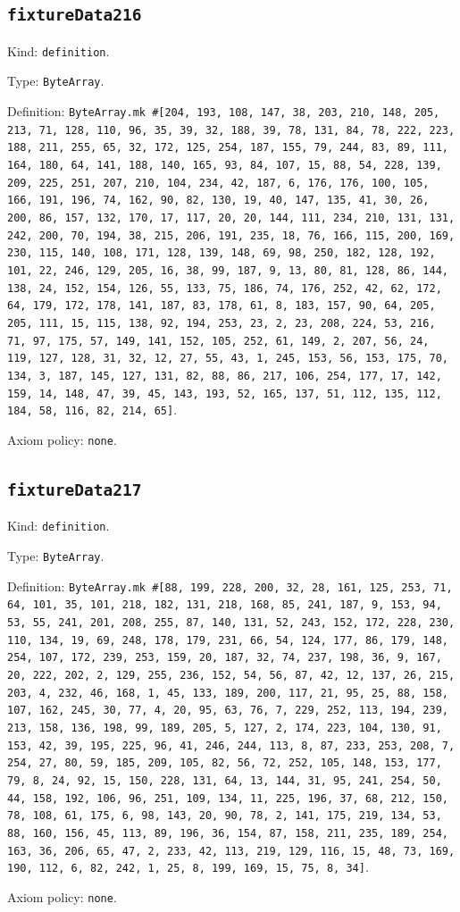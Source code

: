 \documentclass[11pt]{article}
\begin{document}
\subsection*{\texttt{fixtureData216}}
\noindent Kind: \texttt{definition}.\par
\noindent Type: \texttt{ByteArray}.\par
\noindent Definition: \texttt{ByteArray.mk \#[204, 193, 108, 147, 38, 203, 210, 148, 205, 213, 71, 128, 110, 96, 35, 39, 32, 188, 39, 78, 131, 84, 78, 222, 223, 188, 211, 255, 65, 32, 172, 125, 254, 187, 155, 79, 244, 83, 89, 111, 164, 180, 64, 141, 188, 140, 165, 93, 84, 107, 15, 88, 54, 228, 139, 209, 225, 251, 207, 210, 104, 234, 42, 187, 6, 176, 176, 100, 105, 166, 191, 196, 74, 162, 90, 82, 130, 19, 40, 147, 135, 41, 30, 26, 200, 86, 157, 132, 170, 17, 117, 20, 20, 144, 111, 234, 210, 131, 131, 242, 200, 70, 194, 38, 215, 206, 191, 235, 18, 76, 166, 115, 200, 169, 230, 115, 140, 108, 171, 128, 139, 148, 69, 98, 250, 182, 128, 192, 101, 22, 246, 129, 205, 16, 38, 99, 187, 9, 13, 80, 81, 128, 86, 144, 138, 24, 152, 154, 126, 55, 133, 75, 186, 74, 176, 252, 42, 62, 172, 64, 179, 172, 178, 141, 187, 83, 178, 61, 8, 183, 157, 90, 64, 205, 205, 111, 15, 115, 138, 92, 194, 253, 23, 2, 23, 208, 224, 53, 216, 71, 97, 175, 57, 149, 141, 152, 105, 252, 61, 149, 2, 207, 56, 24, 119, 127, 128, 31, 32, 12, 27, 55, 43, 1, 245, 153, 56, 153, 175, 70, 134, 3, 187, 145, 127, 131, 82, 88, 86, 217, 106, 254, 177, 17, 142, 159, 14, 148, 47, 39, 45, 143, 193, 52, 165, 137, 51, 112, 135, 112, 184, 58, 116, 82, 214, 65]}.\par
\noindent Axiom policy: \texttt{none}.\par
\subsection*{\texttt{fixtureData217}}
\noindent Kind: \texttt{definition}.\par
\noindent Type: \texttt{ByteArray}.\par
\noindent Definition: \texttt{ByteArray.mk \#[88, 199, 228, 200, 32, 28, 161, 125, 253, 71, 64, 101, 35, 101, 218, 182, 131, 218, 168, 85, 241, 187, 9, 153, 94, 53, 55, 241, 201, 208, 255, 87, 140, 131, 52, 243, 152, 172, 228, 230, 110, 134, 19, 69, 248, 178, 179, 231, 66, 54, 124, 177, 86, 179, 148, 254, 107, 172, 239, 253, 159, 20, 187, 32, 74, 237, 198, 36, 9, 167, 20, 222, 202, 2, 129, 255, 236, 152, 54, 56, 87, 42, 12, 137, 26, 215, 203, 4, 232, 46, 168, 1, 45, 133, 189, 200, 117, 21, 95, 25, 88, 158, 107, 162, 245, 30, 77, 4, 20, 95, 63, 76, 7, 229, 252, 113, 194, 239, 213, 158, 136, 198, 99, 189, 205, 5, 127, 2, 174, 223, 104, 130, 91, 153, 42, 39, 195, 225, 96, 41, 246, 244, 113, 8, 87, 233, 253, 208, 7, 254, 27, 80, 59, 185, 209, 105, 82, 56, 72, 252, 105, 148, 153, 177, 79, 8, 24, 92, 15, 150, 228, 131, 64, 13, 144, 31, 95, 241, 254, 50, 44, 158, 192, 106, 96, 251, 109, 134, 11, 225, 196, 37, 68, 212, 150, 78, 108, 61, 175, 6, 98, 143, 20, 90, 78, 2, 141, 175, 219, 134, 53, 88, 160, 156, 45, 113, 89, 196, 36, 154, 87, 158, 211, 235, 189, 254, 163, 36, 206, 65, 47, 2, 233, 42, 113, 219, 129, 116, 15, 48, 73, 169, 190, 112, 6, 82, 242, 1, 25, 8, 199, 169, 15, 75, 8, 34]}.\par
\noindent Axiom policy: \texttt{none}.\par
\end{document}
